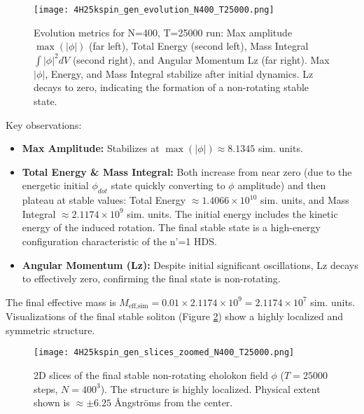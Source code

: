 \documentclass[11pt]{article}
\begin{document}
\begin{figure}[htbp]
    \centering
    \texttt{[image: 4H25kspin\_gen\_evolution\_N400\_T25000.png]}
    \caption{Evolution metrics for N=400, T=25000 run: Max amplitude \(\max(|\phi|)\) (far left), Total Energy (second left), Mass Integral \(\int|\phi|^2dV\) (second right), and Angular Momentum Lz (far right). Max\(|\phi|\), Energy, and Mass Integral stabilize after initial dynamics. Lz decays to zero, indicating the formation of a non-rotating stable state.}
    \label{fig:spin_gen_evolution_N400}
\end{figure}

Key observations:
\begin{itemize}
    \item \textbf{Max Amplitude:} Stabilizes at \(\max(|\phi|) \approx 8.1345\) sim. units.
    \item \textbf{Total Energy \& Mass Integral:} Both increase from near zero (due to the energetic initial \(\phi_{dot}\) state quickly converting to \(\phi\) amplitude) and then plateau at stable values: Total Energy \(\approx 1.4066 \times 10^{10}\) sim. units, and Mass Integral \(\approx 2.1174 \times 10^9\) sim. units. The initial energy includes the kinetic energy of the induced rotation. The final stable state is a high-energy configuration characteristic of the n'=1 HDS.
    \item \textbf{Angular Momentum (Lz):} Despite initial significant oscillations, Lz decays to effectively zero, confirming the final state is non-rotating.
\end{itemize}
The final effective mass is \(M_{\text{eff,sim}} = 0.01 \times 2.1174 \times 10^9 = 2.1174 \times 10^7\) sim. units.
Visualizations of the final stable soliton (Figure \ref{fig:spin_gen_slices_zoomed_N400}) show a highly localized and symmetric structure.

\begin{figure}[htbp]
    \centering
    \texttt{[image: 4H25kspin\_gen\_slices\_zoomed\_N400\_T25000.png]}
    \caption{2D slices of the final stable non-rotating eholokon field \(\phi\) (\(T=25000\) steps, \(N=400^3\)). The structure is highly localized. Physical extent shown is \(\approx \pm 6.25\) Ångströms from the center.}
    \label{fig:spin_gen_slices_zoomed_N400}
\end{figure}
\end{document}
